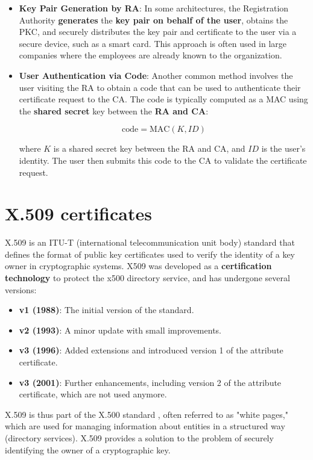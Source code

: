 \begin{itemize}
  \item \textbf{Key Pair Generation by RA}: In some architectures, the
    Registration Authority \textbf{generates} the \textbf{key pair on
    behalf of the user}, obtains the PKC, and securely distributes the
    key pair and certificate to the user via a secure device, such as
    a smart card. This approach is often used in large companies where
    the employees are already known to the organization.

  \item \textbf{User Authentication via Code}: Another common method
    involves the user visiting the RA to obtain a code that can be
    used to authenticate their certificate request to the CA. The code
    is typically computed as a MAC using the \textbf{shared secret}
    key between the \textbf{RA and CA}:

    \[
      \text{code} = \text{MAC}(K, ID)
    \]

    where \(K\) is a shared secret key between the RA and CA, and
    \(ID\) is the user's identity. The user then submits this code to
    the CA to validate the certificate request.
\end{itemize}

\section{X.509 certificates}

X.509 is an ITU-T (international telecommunication unit body) standard
that defines the format of public key certificates used to verify the
identity of a key owner in cryptographic systems. X509 was developed
as a \textbf{certification technology} to protect the x500 directory
service, and has undergone several versions:

\begin{itemize}
  \item \textbf{v1 (1988)}: The initial version of the standard.
  \item \textbf{v2 (1993)}: A minor update with small improvements.
  \item \textbf{v3 (1996)}: Added extensions and introduced version
    1 of the attribute certificate.
  \item \textbf{v3 (2001)}: Further enhancements, including version
    2 of the attribute certificate, which are not used anymore.
\end{itemize}

X.509 is thus part of the X.500 standard , often referred to as "white
pages," which are used for managing information about entities in a
structured way (directory services). X.509 provides a solution to the
problem of securely identifying the owner of a cryptographic key.

